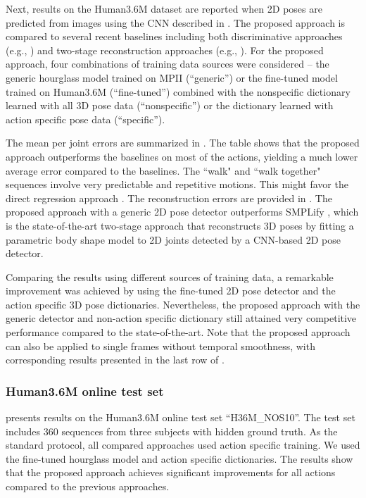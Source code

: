 Next, results on the Human3.6M dataset are reported when 2D poses are predicted from images using the CNN described in . The proposed approach is compared to several recent baselines including both discriminative approaches (e.g., \cite{ionescu2014human,li2015maximum,tekin2015predicting}) and two-stage reconstruction approaches (e.g., \cite{bogo2016keep}). For the proposed approach, four combinations of training data sources were considered -- the generic hourglass model trained on MPII (``generic'') or the fine-tuned model trained on Human3.6M (``fine-tuned'') combined with the nonspecific dictionary learned with all 3D pose data (``nonspecific'') or the dictionary learned with action specific pose data (``specific'').

The mean per joint errors are summarized in . The table shows that the proposed approach outperforms the baselines on most of the actions, yielding a much lower average error compared to the baselines. The ``walk" and ``walk together" sequences involve very predictable and repetitive motions. This might favor the direct regression approach \cite{tekin2015predicting}. The reconstruction errors are provided in . The proposed approach with a generic 2D pose detector outperforms SMPLify \cite{bogo2016keep}, which is the state-of-the-art two-stage approach that reconstructs 3D poses by fitting a parametric body shape model to 2D joints detected by a CNN-based 2D pose detector.

Comparing the results using different sources of training data, a remarkable improvement was achieved by using the fine-tuned 2D pose detector and the action specific 3D pose dictionaries. Nevertheless, the proposed approach with the generic detector and non-action specific dictionary still attained very competitive performance compared to the state-of-the-art. Note that the proposed approach can also be applied to single frames without temporal smoothness, with corresponding results presented in the last row of . 

\subsubsection{Human3.6M online test set}
 presents results on the Human3.6M online test set ``H36M\_NOS10''.  The test set includes 360 sequences from three subjects with hidden ground truth. As the standard protocol, all compared approaches used action specific training. 
We used the fine-tuned hourglass model and action specific dictionaries. The results show that the proposed approach achieves significant improvements for all actions compared to the previous approaches.


